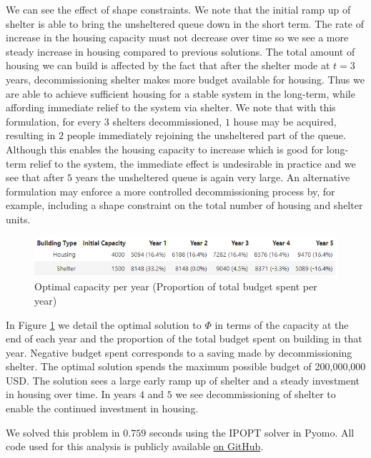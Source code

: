 \documentclass[12pt,a4paper]{article}
\begin{document}
We can see the effect of shape constraints. We note that the initial ramp up of shelter is able to bring the unsheltered queue down in the short term. The rate of increase in the housing capacity must not decrease over time so we see a more steady increase in housing compared to previous solutions. The total amount of housing we can build is affected by the fact that after the shelter mode at $t=3$ years, decommissioning shelter makes more budget available for housing. Thus we are able to achieve sufficient housing for a stable system in the long-term, while affording immediate relief to the system via shelter. We note that with this formulation, for every $3$ shelters decommissioned, $1$ house may be acquired, resulting in $2$ people immediately rejoining the unsheltered part of the queue. Although this enables the housing capacity to increase which is good for long-term relief to the system, the immediate effect is undesirable in practice and we see that after $5$ years the unsheltered queue is again very large. An alternative formulation may enforce a more controlled decommissioning process by, for example, including a shape constraint on the total number of housing and shelter units.      
\begin{figure}[h!]
    \centering
    \includegraphics[scale=0.8]{results_comparison.png}
    \caption{Optimal capacity per year (Proportion of total budget spent per year)}
    \label{tab:phi1phi2results}
\end{figure}

In Figure \ref{tab:phi1phi2results} we detail the optimal solution to $\Phi$ in terms of the capacity at the end of each year and the proportion of the total budget spent on building in that year. Negative budget spent corresponds to a saving made by decommissioning shelter. The optimal solution spends the maximum possible budget of 200,000,000 USD. The solution sees a large early ramp up of shelter and a steady investment in housing over time. In years $4$ and $5$ we see decommissioning of shelter to enable the continued investment in housing. 

We solved this problem in $0.759$ seconds using the IPOPT solver in Pyomo. All code used for this analysis is publicly available \href{https://github.com/grahamburgess3/psor-paper-housing}{on GitHub}.
\end{document}
